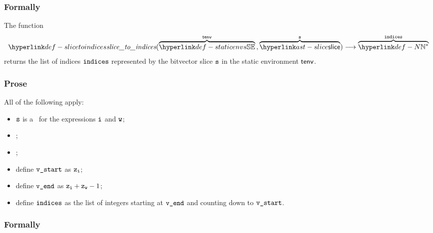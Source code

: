 \subsubsection{Formally}
\begin{mathpar}
\end{mathpar}

\hypertarget{def-slicetoindices}{}
The function
\[
\slicetoindices(\overname{\staticenvs}{\tenv} \aslsep \overname{\slice}{\vs}) \aslto \overname{\N^*}{\indices}
\]
returns the list of indices $\indices$ represented by the bitvector slice $\vs$ in the static environment $\tenv$.

\subsubsection{Prose}
All of the following apply:
\begin{itemize}
  \item $\vs$ is a \lengthslice\ for the expressions $\vi$ and $\vw$;
  \item {};
  \item {};
  \item define $\vstart$ as $\vz_\vi$;
  \item define $\vend$ as $\vz_\vi + \vz_\vw - 1$;
  \item define $\indices$ as the list of integers starting at $\vend$ and counting down to $\vstart$.
\end{itemize}

\subsubsection{Formally}
\begin{mathpar}
\end{mathpar}
